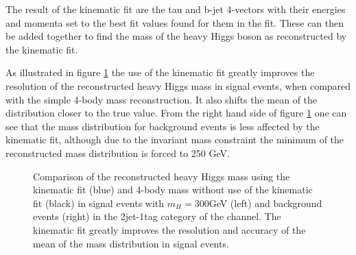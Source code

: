 The result of the kinematic fit are the tau and b-jet 4-vectors with their energies and momenta
set to the best fit values found for them in the fit. These can then be added together to find
the mass of the heavy Higgs boson as reconstructed by the kinematic fit.

As illustrated in figure \ref{fig:kinfitvsmjj} the use of the kinematic fit greatly
improves the resolution of the reconstructed heavy Higgs mass in signal events, when 
compared with the simple 4-body mass reconstruction. It also shifts the mean of the
distribution closer to the true value. From the right hand side of
figure \ref{fig:kinfitvsmjj} one can see that the mass distribution for
background events is less affected by the kinematic fit, although due to the
invariant mass constraint the minimum of the reconstructed mass distribution
is forced to 250 GeV.

\begin{figure}[h!]
\begin{center}
\end{center}
\caption{Comparison of the reconstructed heavy Higgs mass using the kinematic fit (blue) and
4-body mass without use of the kinematic fit (black) in signal events with $m_{H} = 300 $GeV (left) and \ttbar background events (right) in 
the 2jet-1tag category of the \mutau channel. The kinematic fit greatly improves the resolution and 
accuracy of the mean of the mass distribution in signal events. \cite{HIG-14-034-additional}}%
\label{fig:kinfitvsmjj}
\end{figure}



